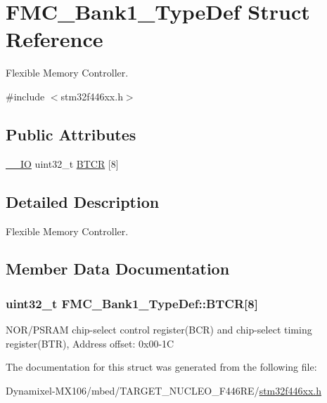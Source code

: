 \hypertarget{struct_f_m_c___bank1___type_def}{}\section{F\+M\+C\+\_\+\+Bank1\+\_\+\+Type\+Def Struct Reference}
\label{struct_f_m_c___bank1___type_def}


Flexible Memory Controller.  




{\ttfamily \#include $<$stm32f446xx.\+h$>$}

\subsection*{Public Attributes}
\begin{DoxyCompactItemize}
\item 
\hyperlink{core__sc300_8h_aec43007d9998a0a0e01faede4133d6be}{\+\_\+\+\_\+\+IO} uint32\+\_\+t \hyperlink{struct_f_m_c___bank1___type_def_a161ea3265a8e17e5c7ef12f7ea19ff52}{B\+T\+CR} \mbox{[}8\mbox{]}
\end{DoxyCompactItemize}


\subsection{Detailed Description}
Flexible Memory Controller. 

\subsection{Member Data Documentation}
\subsubsection[{\texorpdfstring{B\+T\+CR}{BTCR}}]{ uint32\+\_\+t F\+M\+C\+\_\+\+Bank1\+\_\+\+Type\+Def\+::\+B\+T\+CR\mbox{[}8\mbox{]}}\hypertarget{struct_f_m_c___bank1___type_def_a161ea3265a8e17e5c7ef12f7ea19ff52}{}\label{struct_f_m_c___bank1___type_def_a161ea3265a8e17e5c7ef12f7ea19ff52}
N\+O\+R/\+P\+S\+R\+AM chip-\/select control register(\+B\+C\+R) and chip-\/select timing register(\+B\+T\+R), Address offset\+: 0x00-\/1C 

The documentation for this struct was generated from the following file\+:\begin{DoxyCompactItemize}
\item 
Dynamixel-\/\+M\+X106/mbed/\+T\+A\+R\+G\+E\+T\+\_\+\+N\+U\+C\+L\+E\+O\+\_\+\+F446\+R\+E/\hyperlink{stm32f446xx_8h}{stm32f446xx.\+h}\end{DoxyCompactItemize}
